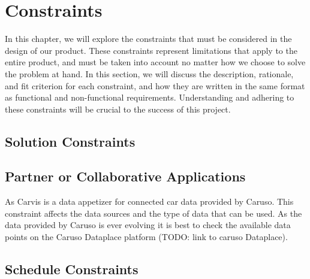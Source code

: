 \chapter{Constraints}

In this chapter, we will explore the constraints that must be considered in the design of our product. These constraints represent limitations that apply to the entire product, and must be taken into account no matter how we choose to solve the problem at hand. In this section, we will discuss the description, rationale, and fit criterion for each constraint, and how they are written in the same format as functional and non-functional requirements. Understanding and adhering to these constraints will be crucial to the success of this project.

\section{Solution Constraints}


\section{Partner or Collaborative Applications}

As Carvis is a data appetizer for connected car data provided by Caruso. This constraint affects the data sources and the type of data that can be used. As the data provided by Caruso is ever evolving it is best to check the available data points on the Caruso Dataplace platform (TODO: link to caruso Dataplace).



\section{Schedule Constraints}

